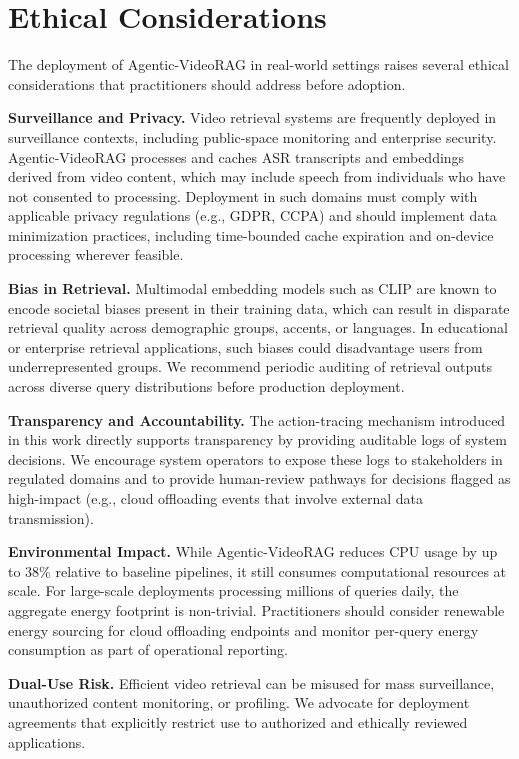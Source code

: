 \documentclass[conference,twocolumn]{IEEEtran}
\begin{document}
\section{Ethical Considerations}

The deployment of Agentic-VideoRAG in real-world settings raises several ethical considerations that practitioners should address before adoption.

\textbf{Surveillance and Privacy.} Video retrieval systems are frequently deployed in surveillance contexts, including public-space monitoring and enterprise security. Agentic-VideoRAG processes and caches ASR transcripts and embeddings derived from video content, which may include speech from individuals who have not consented to processing. Deployment in such domains must comply with applicable privacy regulations (e.g., GDPR, CCPA) and should implement data minimization practices, including time-bounded cache expiration and on-device processing wherever feasible.

\textbf{Bias in Retrieval.} Multimodal embedding models such as CLIP are known to encode societal biases present in their training data, which can result in disparate retrieval quality across demographic groups, accents, or languages. In educational or enterprise retrieval applications, such biases could disadvantage users from underrepresented groups. We recommend periodic auditing of retrieval outputs across diverse query distributions before production deployment.

\textbf{Transparency and Accountability.} The action-tracing mechanism introduced in this work directly supports transparency by providing auditable logs of system decisions. We encourage system operators to expose these logs to stakeholders in regulated domains and to provide human-review pathways for decisions flagged as high-impact (e.g., cloud offloading events that involve external data transmission).

\textbf{Environmental Impact.} While Agentic-VideoRAG reduces CPU usage by up to 38\% relative to baseline pipelines, it still consumes computational resources at scale. For large-scale deployments processing millions of queries daily, the aggregate energy footprint is non-trivial. Practitioners should consider renewable energy sourcing for cloud offloading endpoints and monitor per-query energy consumption as part of operational reporting.

\textbf{Dual-Use Risk.} Efficient video retrieval can be misused for mass surveillance, unauthorized content monitoring, or profiling. We advocate for deployment agreements that explicitly restrict use to authorized and ethically reviewed applications.
\end{document}
